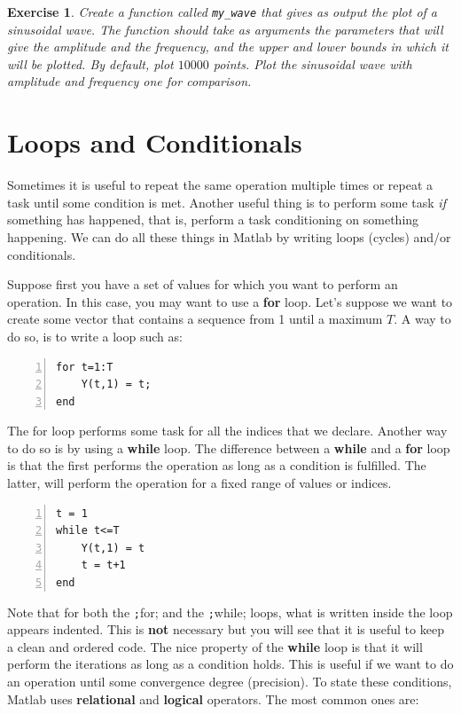 \documentclass[a4paper,11pt]{article}
\newtheorem{exercise}{Exercise}
\begin{document}
\begin{exercise}
Create a function called \verb;my_wave; that gives as output the plot of a sinusoidal wave. The function should take as arguments the parameters that will give the amplitude and the frequency, and the upper and lower bounds in which it will be plotted. By default, plot $10000$ points. Plot the sinusoidal wave with amplitude and frequency one for comparison.
\end{exercise}

\section{Loops and Conditionals}

Sometimes it is useful to repeat the same operation multiple times or repeat a task until some condition is met. Another useful thing is to perform some task \textit{if} something has happened, that is, perform a task conditioning on something happening. We can do all these things in Matlab by writing loops (cycles) and/or conditionals.

Suppose first you have a set of values for which you want to perform an operation. In this case, you may want to use a \textbf{for} loop. Let's suppose we want to create some vector that contains a sequence from 1 until a maximum $T$. A way to do so, is to write a loop such as:

\begin{Verbatim}[numbers=left, fontsize = \small]
for t=1:T
	Y(t,1) = t;
end
\end{Verbatim}

The for loop performs some task for all the indices that we declare. Another way to do so is by using a \textbf{while} loop. The difference between a \textbf{while} and a \textbf{for} loop is that the first performs the operation as long as a condition is fulfilled. The latter, will perform the operation for a fixed range of values or indices.

\begin{Verbatim}[numbers=left, fontsize = \small]
t = 1
while t<=T
	Y(t,1) = t
 	t = t+1
end
\end{Verbatim}

Note that for both the \texttt;for; and the \texttt;while; loops, what is written inside the loop appears indented. This is \textbf{not} necessary but you will see that it is useful to keep a clean and ordered code. The nice property of the \textbf{while} loop is that it will perform the iterations as long as a condition holds. This is useful if we want to do an operation until some convergence degree (precision). To state these conditions, Matlab uses \textbf{relational} and \textbf{logical} operators. The most common ones are:
\end{document}
